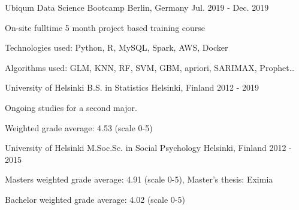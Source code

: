 

\begin{cventries}


  \cventry
    {Ubiqum} %
    {Data Science Bootcamp} %
    {Berlin, Germany} %
    {Jul. 2019 - Dec. 2019} %
    {
      \begin{cvitems} %
        \item {On-site fulltime 5 month project based training course}
        \item {Technologies used: Python, R, MySQL, Spark, AWS, Docker}
        \item {Algorithms used: GLM, KNN, RF, SVM, GBM, apriori, SARIMAX, Prophet\ldots}
      \end{cvitems}
    }

  \cventry
    {University of Helsinki} %
    {B.S. in Statistics} %
    {Helsinki, Finland} %
    {2012 - 2019} %
    {
      \begin{cvitems} %
        \item {Ongoing studies for a second major.}
        \item {Weighted grade average: 4.53 (scale 0-5)}
      \end{cvitems}
    }

  \cventry
    {University of Helsinki} %
    {M.Soc.Sc. in Social Psychology} %
    {Helsinki, Finland} %
    {2012 - 2015} %
    {
      \begin{cvitems} %
        \item {Masters weighted grade average: 4.91 (scale 0-5), Master's thesis: Eximia}
        \item {Bachelor weighted grade average: 4.02 (scale 0-5)}
      \end{cvitems}
    }

\end{cventries}
